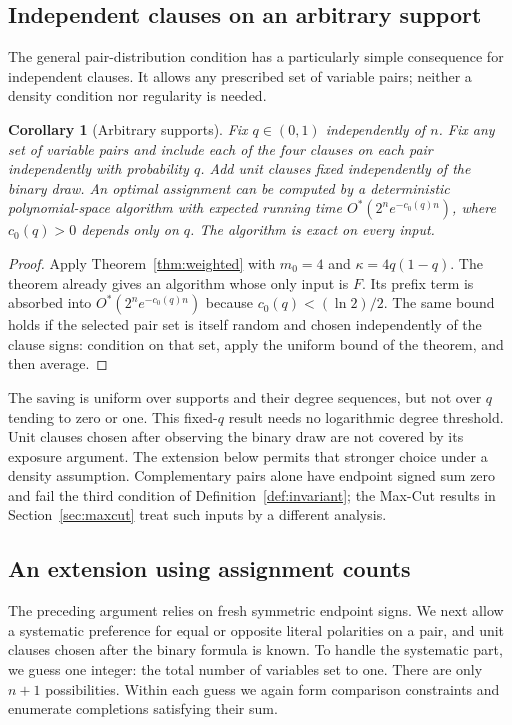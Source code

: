 \documentclass[11pt,a4paper]{article}
\newtheorem{corollary}[theorem]{Corollary}
\theoremstyle{definition}
\theoremstyle{remark}
\newcommand{\Ostar}{O^{*}}
\begin{document}
\subsection{Independent clauses on an arbitrary support}

The general pair-distribution condition has a particularly simple
consequence for independent clauses. It allows any prescribed set of
variable pairs; neither a density condition nor regularity is needed.

\begin{corollary}[Arbitrary supports]\label{cor:support}
Fix $q\in(0,1)$ independently of $n$. Fix any set of variable pairs and
include each of the four clauses on each pair independently with
probability $q$. Add unit clauses fixed independently of the binary draw.
An optimal assignment can be computed by a deterministic polynomial-space
algorithm with expected running time
$\Ostar(2^n e^{-c_0(q)n})$, where $c_0(q)>0$ depends only on $q$.
The algorithm is exact on every input.
\end{corollary}
\begin{proof}
Apply Theorem~\ref{thm:weighted} with $m_0=4$ and
$\kappa=4q(1-q)$. The theorem already gives an algorithm whose only input
is $F$. Its prefix term is absorbed into $\Ostar(2^n e^{-c_0(q)n})$
because $c_0(q)<(\ln2)/2$. The same bound holds if the selected pair set
is itself random and chosen independently of the clause signs: condition
on that set, apply the uniform bound of the theorem, and then average.
\end{proof}

The saving is uniform over supports and their degree sequences, but
not over $q$ tending to zero or one. This fixed-$q$ result needs no
logarithmic degree threshold. Unit clauses chosen after observing the
binary draw are not covered by its exposure argument. The extension
below permits that stronger choice under a density assumption.
Complementary pairs alone have endpoint signed sum zero and fail the
third condition of Definition~\ref{def:invariant}; the Max-Cut results
in Section~\ref{sec:maxcut} treat such inputs by a different analysis.


\subsection{An extension using assignment counts}\label{sec:countalgorithm}

The preceding argument relies on fresh symmetric endpoint signs.
We next allow a systematic preference for equal or opposite literal
polarities on a pair, and unit clauses chosen after the binary formula
is known. To handle the systematic part, we guess one integer: the total
number of variables set to one. There are only $n+1$ possibilities.
Within each guess we again form comparison constraints and enumerate
completions satisfying their sum.
\end{document}
